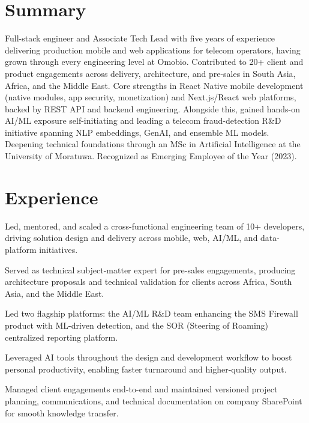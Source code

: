 \documentclass[10.5pt]{article}
\begin{document}

\section*{Summary}
Full-stack engineer and Associate Tech Lead with five years of experience delivering production mobile and web applications for telecom operators, having grown through every engineering level at Omobio. Contributed to 20+ client and product engagements across delivery, architecture, and pre-sales in South Asia, Africa, and the Middle East. Core strengths in React Native mobile development (native modules, app security, monetization) and Next.js/React web platforms, backed by REST API and backend engineering. Alongside this, gained hands-on AI/ML exposure self-initiating and leading a telecom fraud-detection R\&D initiative spanning NLP embeddings, GenAI, and ensemble ML models. Deepening technical foundations through an MSc in Artificial Intelligence at the University of Moratuwa. Recognized as Emerging Employee of the Year (2023).

\section*{Experience}

\begin{cvitems}
  \item Led, mentored, and scaled a cross-functional engineering team of 10+ developers, driving solution design and delivery across mobile, web, AI/ML, and data-platform initiatives.
  \item Served as technical subject-matter expert for pre-sales engagements, producing architecture proposals and technical validation for clients across Africa, South Asia, and the Middle East.
  \item Led two flagship platforms: the AI/ML R\&D team enhancing the SMS Firewall product with ML-driven detection, and the SOR (Steering of Roaming) centralized reporting platform.
  \item Leveraged AI tools throughout the design and development workflow to boost personal productivity, enabling faster turnaround and higher-quality output.
  \item Managed client engagements end-to-end and maintained versioned project planning, communications, and technical documentation on company SharePoint for smooth knowledge transfer.
\end{cvitems}
\end{document}
